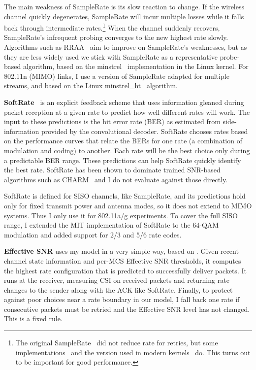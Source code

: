 The main weakness of SampleRate is its slow reaction to change. If the wireless channel quickly degenerates, SampleRate will incur multiple losses while it falls back through intermediate rates.\footnote{The original SampleRate~\cite{Bicket_SampleRate} did not reduce rate for retries, but some implementations~\cite{Judd_CHARM} and the version used in modern kernels~\cite{minstrel} do. This turns out to be important for good performance.} When the channel suddenly recovers, SampleRate's infrequent probing converges to the new highest rate slowly. Algorithms such as 
RRAA~\cite{Wong_RRAA} aim to improve on SampleRate's weaknesses, but as they are less widely used we stick with SampleRate as a representative probe-based algorithm, based on the minstrel~\cite{minstrel} implementation in the Linux kernel. For 802.11n (MIMO) links, I use a version of SampleRate adapted for multiple streams, and based on the Linux minstrel\_ht~\cite{minstrel_ht} algorithm.

\textbf{SoftRate}~\cite{Vutukuru_SoftRate} is an explicit feedback scheme that uses information gleaned during packet reception at a given rate to predict how well different rates will work. The input to these predictions is the bit error rate (BER) as estimated from side-information provided by the convolutional decoder. SoftRate chooses rates based on the performance curves that relate the BERs for one rate (a combination of modulation and coding) to another. %
Each rate will be the best choice only during a predictable BER range. These predictions can help SoftRate quickly identify the best rate. SoftRate has been shown to dominate trained SNR-based algorithms such as CHARM~\cite{Judd_CHARM} and I do not evaluate against those directly.


SoftRate is defined for SISO channels, like SampleRate, 
and its predictions hold only for fixed transmit power and antenna modes, so it does not extend to MIMO systems.
Thus I only use it for 802.11a/g experiments. To cover the full SISO range, I extended the MIT implementation of SoftRate to the 64-QAM modulation and added support for 2/3 and 5/6 rate codes.

\textbf{Effective SNR} uses my model in a very simple way, based on . Given recent channel state information and per-MCS Effective SNR thresholds, it computes the highest rate configuration that is predicted to successfully deliver packets. It runs at the receiver, measuring CSI on received packets and returning rate changes to the sender along with the ACK like SoftRate. Finally, to protect against poor choices near a rate boundary in our model, I fall back one rate if consecutive packets must be retried and the Effective SNR level has not changed. This is a fixed rule.

